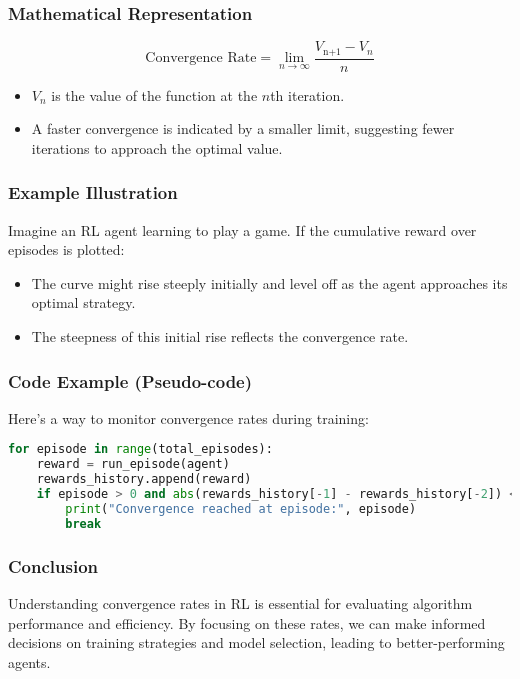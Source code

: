 \documentclass{beamer}
\begin{document}
\begin{frame}[fragile]
    \frametitle{Mathematical Representation}
    \begin{equation}
        \text{Convergence Rate} = \lim_{n \to \infty} \frac{V_{\text{n+1}} - V_n}{n}
    \end{equation}
    \begin{itemize}
        \item $V_n$ is the value of the function at the $n$th iteration.
        \item A faster convergence is indicated by a smaller limit, suggesting fewer iterations to approach the optimal value.
    \end{itemize}
\end{frame}

\begin{frame}[fragile]
    \frametitle{Example Illustration}
    Imagine an RL agent learning to play a game. If the cumulative reward over episodes is plotted:

    \begin{itemize}
        \item The curve might rise steeply initially and level off as the agent approaches its optimal strategy.
        \item The steepness of this initial rise reflects the convergence rate.
    \end{itemize}
\end{frame}

\begin{frame}[fragile]
    \frametitle{Code Example (Pseudo-code)}
    Here's a way to monitor convergence rates during training:
    \begin{lstlisting}[language=Python]
for episode in range(total_episodes):
    reward = run_episode(agent)
    rewards_history.append(reward)
    if episode > 0 and abs(rewards_history[-1] - rewards_history[-2]) < threshold:
        print("Convergence reached at episode:", episode)
        break
    \end{lstlisting}
\end{frame}

\begin{frame}
    \frametitle{Conclusion}
    Understanding convergence rates in RL is essential for evaluating algorithm performance and efficiency. By focusing on these rates, we can make informed decisions on training strategies and model selection, leading to better-performing agents.
\end{frame}
\end{document}
